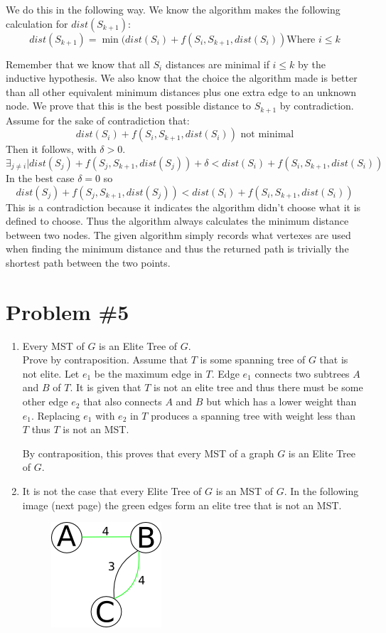\documentclass{article}
\begin{document}
We do this in the following way. We know the algorithm makes the following calculation for $dist(S_{k+1})$:
$$dist(S_{k+1}) = \min(dist(S_i) + f(S_i, S_{k+1}, dist(S_i))\text{Where }i\le k$$

Remember that we know that all $S_i$ distances are minimal if $i\le k$ by the inductive hypothesis. We also know that the choice the algorithm made is better than all other equivalent minimum distances plus one extra edge to an unknown node. We prove that this is the best possible distance to $S_{k+1}$ by contradiction.\\

Assume for the sake of contradiction that:
$$dist(S_i) + f(S_i, S_{k+1}, dist(S_i))\text{ not minimal}$$
Then it follows, with $\delta > 0$. 
$$\exists_{j\not= i}|dist(S_j) + f(S_j, S_{k+1}, dist(S_j)) + \delta < dist(S_i) + f(S_i, S_{k+1}, dist(S_i))$$
In the best case $\delta = 0$ so 
        $$dist(S_j) + f(S_j, S_{k+1}, dist(S_j)) < dist(S_i) + f(S_i, S_{k+1}, dist(S_i))$$
This is a contradiction because it indicates the algorithm didn't choose what it is defined to choose. Thus the algorithm always calculates the minimum distance between two nodes. The given algorithm simply records what vertexes are used when finding the minimum distance and thus the returned path is trivially the shortest path between the two points.

\section*{Problem \#5}
\begin{enumerate}
    \item Every MST of $G$ is an Elite Tree of $G$.\\
        Prove by contraposition. Assume that $T$ is some spanning tree of $G$ that is not elite. Let $e_1$ be the maximum edge in $T$. Edge $e_1$ connects two subtrees $A$ and $B$ of $T$. It is given that $T$ is not an elite tree and thus there must be some other edge $e_2$ that also connects $A$ and $B$ but which has a lower weight than $e_1$. Replacing $e_1$ with $e_2$ in $T$ produces a spanning tree with weight less than $T$ thus $T$ is not an MST.

        By contraposition, this proves that every MST of a graph $G$ is an Elite Tree of $G$.

    \item It is not the case that every Elite Tree of $G$ is an MST of $G$. In the following image (next page) the green edges form an elite tree that is not an MST.
    \begin{figure}[hb]
        \centering
        \includegraphics[scale=0.5]{eliteNotMST}
    \end{figure}
\end{enumerate}
\end{document}
